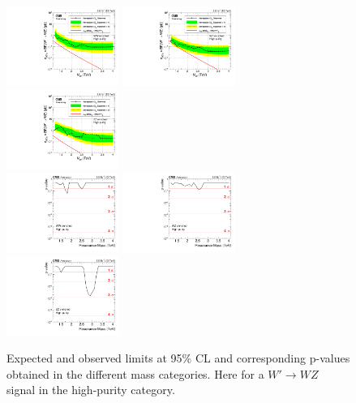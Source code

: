 \begin{figure}[h!]
\centering
\includegraphics[width=0.327\textwidth]{figures/analysis/search1/AN-15-211/limits/brazilianFlag_WZ_WWHP_13TeV_wPDF.pdf}
\includegraphics[width=0.327\textwidth]{figures/analysis/search1/AN-15-211/limits/brazilianFlag_WZ_WZHP_13TeV_wPDF.pdf}
\includegraphics[width=0.327\textwidth]{figures/analysis/search1/AN-15-211/limits/brazilianFlag_WZ_ZZHP_13TeV_wPDF.pdf}\\
\includegraphics[width=0.327\textwidth]{figures/analysis/search1/AN-15-211/pvalues/pvalue_WZinWW_high_purity.pdf}
\includegraphics[width=0.327\textwidth]{figures/analysis/search1/AN-15-211/pvalues/pvalue_WZinWZ_high_purity.pdf}
\includegraphics[width=0.327\textwidth]{figures/analysis/search1/AN-15-211/pvalues/pvalue_WZinZZ_high_purity.pdf}
\caption{Expected and observed limits at 95\% CL and corresponding p-values obtained in the different mass categories. Here for a $W'\rightarrow WZ$ signal in the high-purity category.}
\label{fig:app:Limits_HPWZ}
\end{figure}
